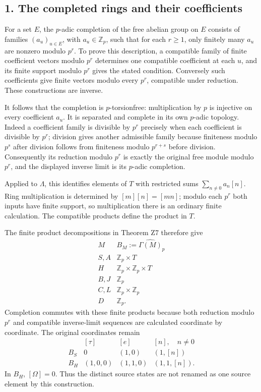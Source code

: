 \documentclass[
]{article}
\begin{document}
\subsection{1. The completed rings and their
coefficients}\label{the-completed-rings-and-their-coefficients}

For a set \(E\), the \(p\)-adic completion of the free abelian group on
\(E\) consists of families \((a_u)_{u\in E}\), with
\(a_u\in\mathbb Z_p\), such that for each \(r\ge1\), only finitely many
\(a_u\) are nonzero modulo \(p^r\). To prove this description, a
compatible family of finite coefficient vectors modulo \(p^r\)
determines one compatible coefficient at each \(u\), and its finite
support modulo \(p^r\) gives the stated condition. Conversely such
coefficients give finite vectors modulo every \(p^r\), compatible under
reduction. These constructions are inverse.

It follows that the completion is \(p\)-torsionfree: multiplication by
\(p\) is injective on every coefficient \(a_u\). It is separated and
complete in its own \(p\)-adic topology. Indeed a coefficient family is
divisible by \(p^r\) precisely when each coefficient is divisible by
\(p^r\); division gives another admissible family because finiteness
modulo \(p^s\) after division follows from finiteness modulo \(p^{r+s}\)
before division. Consequently its reduction modulo \(p^r\) is exactly
the original free module modulo \(p^r\), and the displayed inverse limit
is its \(p\)-adic completion.

Applied to \(\Lambda\), this identifies elements of \(T\) with
restricted sums \(\sum_{n\ne0}a_n[n]\). Ring multiplication is
determined by \([m][n]=[mn]\); modulo each \(p^r\) both inputs have
finite support, so multiplication there is an ordinary finite
calculation. The compatible products define the product in \(T\).

The finite product decompositions in Theorem Z7 therefore give \[
\begin{array}{c|c}
M&B_M:=\widehat{\Gamma(M)}_p\\\hline
S,A&\mathbb Z_p\times T\\
H&\mathbb Z_p\times\mathbb Z_p\times T\\
B,J&\mathbb Z_p\\
C,L&\mathbb Z_p\times\mathbb Z_p\\
D&\mathbb Z_p.
\end{array}
\tag{P2}
\] Completion commutes with these finite products because both reduction
modulo \(p^r\) and compatible inverse-limit sequences are calculated
coordinate by coordinate. The original coordinates remain \[
\begin{array}{c|ccc}
&[\tau]&[e]&[n],\quad n\ne0\\\hline
B_S&0&(1,0)&(1,[n])\\
B_H&(1,0,0)&(1,1,0)&(1,1,[n]).
\end{array}
\tag{P3}
\] In \(B_H\), \([\Omega]=0\). Thus the distinct source states are not
renamed as one source element by this construction.
\end{document}
